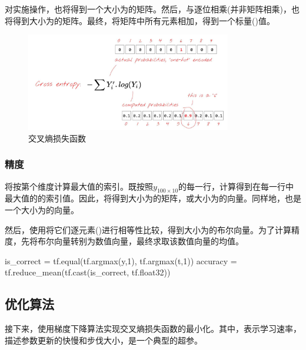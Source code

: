 \begin{content}
\begin{content}
对实施操作，也将得到一个大小为\code{[100, 10]}的矩阵。然后，与逐位相乘(并非矩阵相乘)，也将得到大小为\code{[100, 10]}的矩阵。最终，将矩阵中所有元素相加，得到一个标量()值。

\begin{figure}[H]
\centering
\includegraphics[width=0.8\textwidth]{figures/mnist-cross-entropy.png}
\caption{交叉熵损失函数}
 \label{fig:mnist-cross-entropy}
\end{figure}

\subsubsection{精度}

将按第个维度计算最大值的索引。既按照$ y_{100 \times 10} $的每一行，计算得到在每一行中最大值的的索引值。因此，将得到大小为\code{[100, 1]}的矩阵，或大小为的向量。同样地，也是一个大小为的向量。

然后，使用将它们逐元素()进行相等性比较，得到大小为的布尔向量。为了计算精度，先将布尔向量转别为数值向量，最终求取该数值向量的均值。

\begin{leftbar}
\begin{python}
is_correct = tf.equal(tf.argmax(y,1), tf.argmax(t,1))
accuracy = tf.reduce_mean(tf.cast(is_correct, tf.float32))
\end{python}
\end{leftbar}

\subsection{优化算法}

接下来，使用梯度下降算法实现交叉熵损失函数的最小化。其中，表示学习速率，描述参数更新的快慢和步伐大小，是一个典型的超参。


\end{content}
\end{content}
